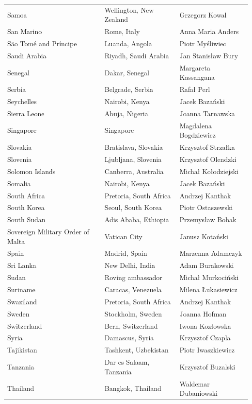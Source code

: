 \documentclass{article}
\begin{document}
\begin{tabular}{lll}
Samoa & Wellington, New Zealand & Grzegorz Kowal \\
San Marino & Rome, Italy & Anna Maria Anders \\
São Tomé and Príncipe & Luanda, Angola & Piotr Myśliwiec \\
Saudi Arabia & Riyadh, Saudi Arabia & Jan Stanisław Bury \\
Senegal & Dakar, Senegal & Margareta Kassangana \\
Serbia & Belgrade, Serbia & Rafał Perl \\
Seychelles & Nairobi, Kenya & Jacek Bazański \\
Sierra Leone & Abuja, Nigeria & Joanna Tarnawska \\
Singapore & Singapore & Magdalena Bogdziewicz \\
Slovakia & Bratislava, Slovakia & Krzysztof Strzałka \\
Slovenia & Ljubljana, Slovenia & Krzysztof Olendzki \\
Solomon Islands & Canberra, Australia & Michał Kołodziejski \\
Somalia & Nairobi, Kenya & Jacek Bazański \\
South Africa & Pretoria, South Africa & Andrzej Kanthak \\
South Korea & Seoul, South Korea & Piotr Ostaszewski \\
South Sudan & Adis Ababa, Ethiopia & Przemysław Bobak \\
Sovereign Military Order of Malta & Vatican City & Janusz Kotański \\
Spain & Madrid, Spain & Marzenna Adamczyk \\
Sri Lanka & New Delhi, India & Adam Burakowski \\
Sudan & Roving ambassador & Michał Murkociński \\
Suriname & Caracas, Venezuela & Milena Łukasiewicz \\
Swaziland & Pretoria, South Africa & Andrzej Kanthak \\
Sweden & Stockholm, Sweden & Joanna Hofman \\
Switzerland & Bern, Switzerland & Iwona Kozłowska \\
Syria & Damascus, Syria & Krzysztof Czapla \\
Tajikistan & Tashkent, Uzbekistan & Piotr Iwaszkiewicz \\
Tanzania & Dar es Salaam, Tanzania & Krzysztof Buzalski \\
Thailand & Bangkok, Thailand & Waldemar Dubaniowski \\

\end{tabular}
\end{document}
